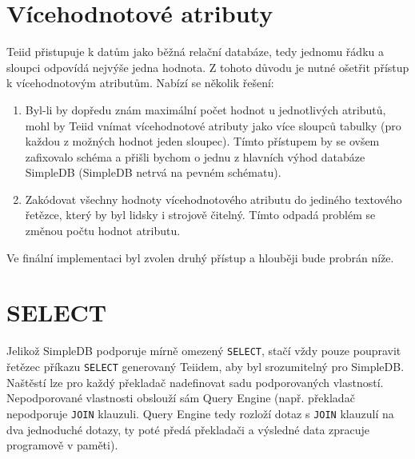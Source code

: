 \documentclass[oneside,12pt,final]{fithesis2}
\begin{document}
\section{Vícehodnotové atributy}
Teiid přistupuje k datům jako běžná relační databáze, tedy jednomu řádku a sloupci odpovídá nejvýše jedna hodnota. Z tohoto důvodu je nutné ošetřit přístup k vícehodnotovým atributům. Nabízí se několik řešení:
\begin{enumerate}
 \item Byl-li by dopředu znám maximální počet hodnot u jednotlivých atributů, mohl by Teiid vnímat vícehodnotové atributy jako více sloupců tabulky (pro každou z možných hodnot jeden sloupec). Tímto přístupem by se ovšem zafixovalo schéma a přišli bychom o jednu z hlavních výhod databáze SimpleDB (SimpleDB netrvá na pevném schématu).
 \item Zakódovat všechny hodnoty vícehodnotového atributu do jediného textového řetězce, který by byl lidsky i strojově čitelný. Tímto odpadá problém se změnou počtu hodnot atributu.
\end{enumerate}
Ve finální implementaci byl zvolen druhý přístup a hlouběji bude probrán níže.

\section{SELECT}
Jelikož SimpleDB podporuje mírně omezený \verb|SELECT|, stačí vždy pouze poupravit řetězec příkazu \verb|SELECT| generovaný Teiidem, aby byl srozumitelný pro SimpleDB. Naštěstí lze pro každý překladač nadefinovat sadu podporovaných vlastností. Nepodporované vlastnosti obslouží sám Query Engine (např. překladač nepodporuje \verb<JOIN< klauzuli. Query Engine tedy rozloží dotaz s \verb<JOIN< klauzulí na dva jednoduché dotazy, ty poté předá překladači a výsledné data zpracuje programově v paměti).
\end{document}
